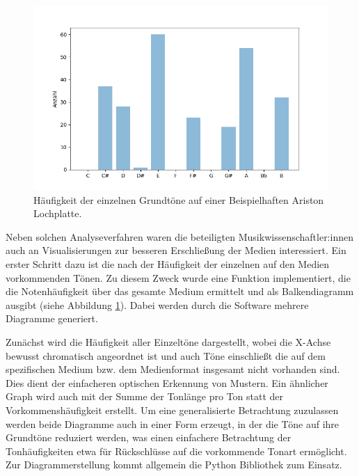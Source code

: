 \begin{figure}[t]
    \centering
    \includegraphics[width=\textwidth]{graphics/base_note_frequencies.png}
    \caption{Häufigkeit der einzelnen Grundtöne auf einer Beispielhaften Ariston Lochplatte.}
    \label{barcharts}
\end{figure}

Neben solchen Analyseverfahren waren die beteiligten Musikwissenschaftler:innen auch an Visualisierungen zur besseren Erschließung der Medien interessiert.
Ein erster Schritt dazu ist die nach der Häufigkeit der einzelnen auf den Medien vorkommenden Tönen.
Zu diesem Zweck wurde eine Funktion implementiert, die die Notenhäufigkeit über das gesamte Medium ermittelt und als Balkendiagramm ausgibt (siehe Abbildung \ref{barcharts}).
Dabei werden durch die Software mehrere Diagramme generiert.

Zunächst wird die Häufigkeit aller Einzeltöne dargestellt, wobei die X-Achse bewusst chromatisch angeordnet ist und auch Töne einschließt die auf dem spezifischen Medium bzw. dem Medienformat insgesamt nicht vorhanden sind.
Dies dient der einfacheren optischen Erkennung von Mustern.
Ein ähnlicher Graph wird auch mit der Summe der Tonlänge pro Ton statt der Vorkommenshäufigkeit erstellt.
Um eine generalisierte Betrachtung zuzulassen werden beide Diagramme auch in einer Form erzeugt, in der die Töne auf ihre Grundtöne reduziert werden, was einen einfachere Betrachtung der Tonhäufigkeiten etwa für Rückschlüsse auf die vorkommende Tonart ermöglicht.
Zur Diagrammerstellung kommt allgemein die Python Bibliothek  \parencite[]{Hunter_2007} zum Einsatz.


